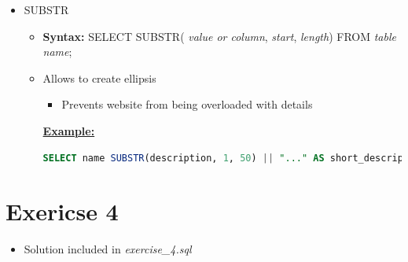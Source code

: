 \documentclass[12pt]{article}
\begin{document}
\begin{itemize}
    \item SUBSTR
    \begin{itemize}
        \item \textbf{Syntax:} SELECT SUBSTR( \textit{value or column}, \textit{start}, \textit{length}) FROM \textit{table name};
        \item Allows to create ellipsis
        \begin{itemize}
            \item Prevents website from being overloaded with details
        \end{itemize}

        \bigskip

        \underline{\textbf{Example:}}

        \bigskip

    \begin{lstlisting}[language=SQL]
    SELECT name SUBSTR(description, 1, 50) || "..." AS short_description, price FROM products;
    \end{lstlisting}

    \end{itemize}
\end{itemize}

\bigskip

\section{Exericse 4}

\bigskip

\begin{itemize}
    \item Solution included in \textit{exercise\_4.sql}
\end{itemize}
\end{document}
